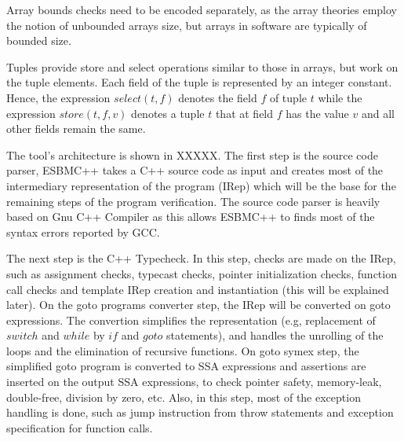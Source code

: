\documentclass[conference]{IEEEtran}
\begin{document}
\noindent
Array bounds checks need to be encoded separately, as the array theories
employ the notion of unbounded arrays size, but arrays in software are
typically of bounded size.


Tuples %
provide
\mbox{store} and \mbox{select} operations similar to those in arrays, but work
on the tuple \mbox{elements}. Each field of the tuple is represented by an
integer constant. Hence, the expression $\mathit{select}(t, f)$ denotes the field $f$
of tuple $t$ while the expression $\mathit{store}(t, f, v)$ denotes a tuple $t$
that at field $f$ has the value $v$ and all other fields remain the
same.

\smallskip{}
%
The tool's architecture is shown in XXXXX. The first step is the source code parser,
ESBMC++ takes a C++ source code as input and creates most of the intermediary
representation of the program (IRep) which will be the base for the remaining steps
of the program verification. The source code parser is heavily based on Gnu C++
Compiler as this allows ESBMC++ to finds most of the syntax errors reported by GCC.

The next step is the C++ Typecheck. In this step, checks are made on the IRep,
such as assignment checks, typecast checks, pointer initialization checks, function
call checks and template IRep creation and instantiation (this will be explained later).
On the goto programs converter step, the IRep will be converted on goto expressions.
The convertion simplifies the representation (e.g, replacement of $switch$ and $while$
by $if$ and $goto$ statements), and handles the unrolling of the loops and the
elimination of recursive functions. On goto symex step, the simplified goto program
is converted to SSA expressions and assertions are inserted on the output SSA
expressions, to check pointer safety, memory-leak, double-free, division by zero, etc.
Also, in this step, most of the exception handling is done, such as jump instruction
from throw statements and exception specification for function calls.
\end{document}
